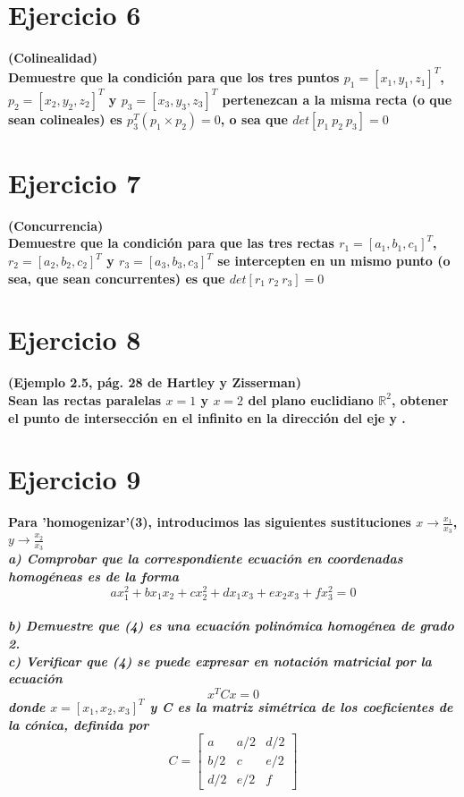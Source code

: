 \documentclass[12pt]{article}
\begin{document}
\section{Ejercicio 6}
\textbf{
(Colinealidad)\\
Demuestre que la condición para que los tres puntos $p_{1}=[x_{1}, y_{1}, z_{1}]^{T}$, $p_{2}=[x_{2}, y_{2}, z_{2}]^{T}$ y $p_{3}=[x_{3}, y_{3}, z_{3}]^{T}$ pertenezcan a la misma recta (o
que sean colineales) es $p_{3}^{T}(p_{1}\times p_{2})=0$, o sea que $det[p_{1}\ p_{2}\ p_{3}]=0$
}
\\


\section{Ejercicio 7}
\textbf{
(Concurrencia)\\
Demuestre que la condición para que las tres rectas $r_{1}=[a_{1}, b_{1}, c_{1}]^{T}$, $r_{2}=[a_{2}, b_{2}, c_{2}]^{T}$ y $r_{3}=[a_{3}, b_{3}, c_{3}]^{T}$ se intercepten en un mismo
punto (o sea, que sean concurrentes) es que $det[r_{1}\ r_{2}\ r_{3}]=0$
}
\\


\section{Ejercicio 8}
\textbf{
(Ejemplo 2.5, pág. 28 de Hartley y Zisserman)\\
Sean las rectas paralelas $x=1$ y $x=2$ del plano euclidiano $\mathbb{R}^{2}$, obtener el punto de intersección en el infinito en la dirección del eje y .
}
\\


\section{Ejercicio 9}
\textbf{Para 'homogenizar'(3), introducimos las siguientes sustituciones $x \rightarrow \frac{x_{1}}{x_{3}}$, $y \rightarrow \frac{x_{2}}{x_{3}}$}
\\

\textit{\textbf{
a) Comprobar que la correspondiente ecuación en coordenadas homogéneas es de la forma $$ax_{1}^2+bx_1x_2+cx_2^2+dx_1x_3+ex_{2}x_{3}+fx_3^2=0$$}}
\\


\textit{\textbf{
b) Demuestre que (4) es una ecuación polinómica homogénea de grado 2.}}
\\

\textit{\textbf{
c) Verificar que (4) se puede expresar en notación matricial por la ecuación $$x^{T}Cx = 0$$ donde $x=[x_{1}, x_{2}, x_{3}]^{T}$ y C es la matriz simétrica de los coeficientes de la cónica, definida por
$$C=\begin{bmatrix}
a & a/2 & d/2 \\
b/2 & c & e/2 \\
d/2 & e/2 & f
\end{bmatrix}$$
}}
\\
\end{document}
